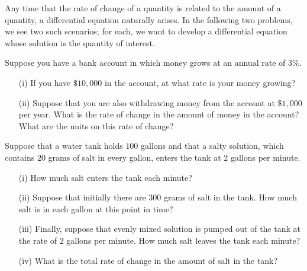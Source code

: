 \begin{activity} \label{A:6.7.4}
Any time that the rate of change of a quantity is related to the amount of a quantity, a differential equation naturally arises.  In the following two problems, we see two such scenarios; for each, we want to develop a differential equation whose solution is the quantity of interest.
  \ba
\item Suppose you have a bank account in which money grows at an
  annual rate of $3$\%.
  \begin{itemize}
    \item[(i)] If you have $\$10,000$ in the account, at what rate is your
      money growing?
    \item[(ii)] Suppose that you are also withdrawing money from the account
      at $\$1,000$ per year.  What is the rate of change in the amount
      of money in the account?  What are the units on this rate of change? 
  \end{itemize}
\item Suppose that a water tank holds $100$ gallons and that a salty
  solution, which contains $20$ grams of salt in every gallon, enters the
  tank at $2$ gallons per minute.   
  \begin{itemize}
    \item[(i)] How much salt enters the tank each minute?
    \item[(ii)] Suppose that initially there are $300$ grams of salt in the tank.  How
      much salt is in each gallon at this point in time?
    \item[(iii)] Finally, suppose that evenly mixed solution is pumped out of the tank at the
      rate of $2$ gallons per minute.  How much salt leaves the tank
      each minute?
    \item[(iv)] What is the total rate of change in the amount of salt in
      the tank?
  \end{itemize}
\ea
\end{activity} 
\aftera
